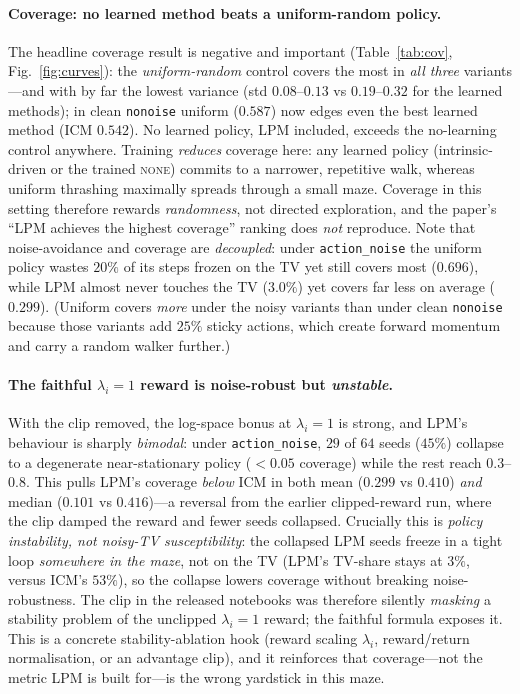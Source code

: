\documentclass[11pt]{article}
\begin{document}
\paragraph{Coverage: no learned method beats a uniform-random policy.} The headline coverage result
is negative and important (Table~\ref{tab:cov}, Fig.~\ref{fig:curves}): the \emph{uniform-random}
control covers the most in \emph{all three} variants---and with by far the lowest variance (std
$0.08$--$0.13$ vs $0.19$--$0.32$ for the learned methods); in clean \texttt{nonoise} uniform ($0.587$)
now edges even the best learned method (ICM $0.542$). No learned policy, LPM included, exceeds the
no-learning control anywhere. Training \emph{reduces} coverage here: any learned policy
(intrinsic-driven or the trained \textsc{none}) commits to a narrower, repetitive walk, whereas
uniform thrashing maximally spreads through a small maze. Coverage in this setting therefore rewards
\emph{randomness}, not directed exploration, and the paper's ``LPM achieves the highest coverage''
ranking does \emph{not} reproduce. Note that noise-avoidance and coverage are \emph{decoupled}: under
\texttt{action\_noise} the uniform policy wastes $20\%$ of its steps frozen on the TV yet still covers
most ($0.696$), while LPM almost never touches the TV ($3.0\%$) yet covers far less on average
($0.299$). (Uniform covers \emph{more} under the noisy variants than under clean \texttt{nonoise}
because those variants add $25\%$ sticky actions, which create forward momentum and carry a random
walker further.)

\paragraph{The faithful $\lambda_i{=}1$ reward is noise-robust but \emph{unstable}.} With the clip
removed, the log-space bonus at $\lambda_i{=}1$ is strong, and LPM's behaviour is sharply
\emph{bimodal}: under \texttt{action\_noise}, $29$ of $64$ seeds ($45\%$) collapse to a degenerate
near-stationary policy ($<\!0.05$ coverage) while the rest reach $0.3$--$0.8$. This pulls LPM's
coverage \emph{below} ICM in both mean ($0.299$ vs $0.410$) \emph{and} median ($0.101$ vs $0.416$)---a
reversal from the earlier clipped-reward run, where the clip damped the reward and fewer seeds
collapsed. Crucially this is \emph{policy instability, not noisy-TV susceptibility}: the collapsed LPM
seeds freeze in a tight loop \emph{somewhere in the maze}, not on the TV (LPM's TV-share stays at
$3\%$, versus ICM's $53\%$), so the collapse lowers coverage without breaking noise-robustness. The
clip in the released notebooks was therefore silently \emph{masking} a stability problem of the
unclipped $\lambda_i{=}1$ reward; the faithful formula exposes it. This is a concrete
stability-ablation hook (reward scaling $\lambda_i$, reward/return normalisation, or an advantage
clip), and it reinforces that coverage---not the metric LPM is built for---is the wrong yardstick in
this maze.
\end{document}
